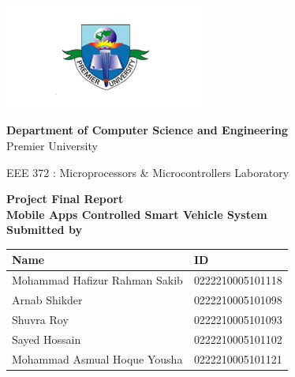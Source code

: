 \documentclass[12pt,a4paper]{report}
\begin{document}
\begin{titlepage}
    \centering
    \begin{center}
        \includegraphics[width=0.5\textwidth]{logo.png} %
    \end{center}
\begin{center}
    \textbf{Department of Computer Science and Engineering}\\
    Premier University
\end{center}
\begin{center}
    \textnormal{EEE 372 : Microprocessors \& Microcontrollers Laboratory}
\end{center}
    \huge
    \textbf{Project Final Report}\\
    \vspace{0.5in}
    \LARGE
    \textbf{Mobile Apps Controlled Smart Vehicle System}\\
    \vspace{1in}
    \large
    \textbf {Submitted by}\\
    \begin{center}
        \renewcommand{\arraystretch}{1.5} %
        \begin{tabular}{|>{\raggedright\arraybackslash}p{}|p{}|} %
        \hline
        \textbf{Name} & \textbf{ID} \\
        \hline
        Mohammad Hafizur Rahman Sakib & 0222210005101118 \\
        \hline
        Arnab Shikder & 0222210005101098 \\
        \hline
        Shuvra Roy & 0222210005101093 \\
        \hline
        Sayed Hossain & 0222210005101102 \\
        \hline
        Mohammad Asmual Hoque Yousha & 0222210005101121 \\
        \hline
        \end{tabular}
        \end{center}
    \vspace{0.5in}
 

\end{titlepage}
\end{document}
